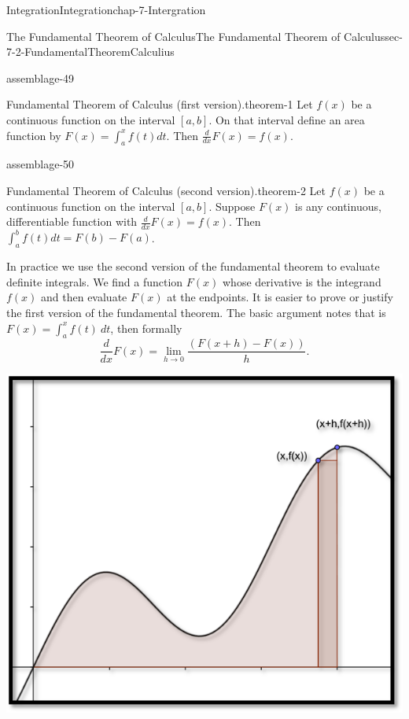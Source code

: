 \documentclass[oneside,10pt,]{book}
\numberwithin{equation}{section}
\begin{document}
\begin{chapterptx}{Integration}{}{Integration}{}{}{chap-7-Intergration}
\begin{sectionptx}{The Fundamental Theorem of Calculus}{}{The Fundamental Theorem of Calculus}{}{}{sec-7-2-FundamentalTheoremCalculius}
\begin{assemblage}{}{assemblage-49}%
\hypertarget{p-2640}{}%
\begin{theorem}{Fundamental Theorem of Calculus (first version).}{}{theorem-1}%
Let \(f(x)\) be a continuous function on the interval \([a, b]\).  On that interval define an area function by \(F(x)=\int_a^x f(t)  dt\). Then \(\frac{d}{dx} F(x)=f(x)\).\end{theorem}
%
\end{assemblage}
\begin{assemblage}{}{assemblage-50}%
\hypertarget{p-2641}{}%
\begin{theorem}{Fundamental Theorem of Calculus (second version).}{}{theorem-2}%
Let \(f(x)\) be a continuous function on the interval \([a, b]\).  Suppose \(F(x)\) is any continuous,  differentiable function with \(\frac{d}{dx} F(x)=f(x)\).  Then \(\int_a^b f(t) dt=F(b)-F(a)\).\end{theorem}
%
\end{assemblage}
\hypertarget{p-2642}{}%
In practice we use the second version of the fundamental theorem to evaluate definite integrals.  We find a function \(F(x)\) whose derivative is the integrand \(f(x)\) and then evaluate \(F(x)\) at the endpoints. It is easier to prove or justify the first version of the fundamental theorem.  The basic argument notes that is \(F(x)=\int_a^xf(t) \ dt\), then formally%
%
\begin{equation*}
\frac{d}{dx} F(x)=\lim_{h\to 0}
\frac{(F(x+h)-F(x))}{h}.
\end{equation*}
\begin{sidebyside}{1}{0.15}{0.15}{0}%
\begin{sbspanel}{0.7}%
\includegraphics[width=1\linewidth]{images/sec7-2-9.png}

\end{sbspanel}
\end{sidebyside}
\end{sectionptx}
\end{chapterptx}
\end{document}
